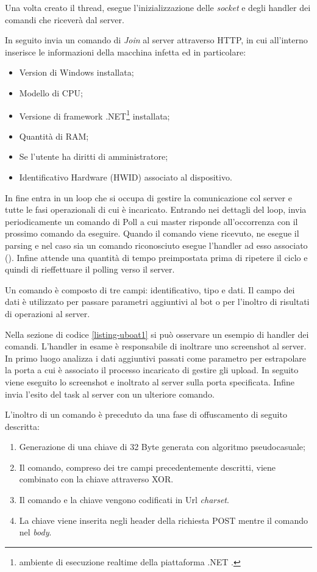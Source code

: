 Una  volta creato il thread, esegue l'inizializzazione delle \textit{socket} e degli handler dei comandi che riceverà dal server.

In seguito invia un comando di \textit{Join} al server attraverso HTTP, in cui all'interno inserisce le informazioni della macchina infetta ed in particolare:
\begin{itemize}
    \item Version di Windows installata;
    \item Modello di CPU;
    \item Versione di framework .NET\footnote{ambiente di esecuzione realtime della piattaforma .NET \cite{netframework}.} installata;
    \item Quantità di RAM;
    \item Se l'utente ha diritti di amministratore;
    \item Identificativo Hardware (HWID) associato al dispositivo.
\end{itemize}
In fine entra in un loop che si occupa di gestire la comunicazione col server e tutte le fasi operazionali di cui è incaricato.
Entrando nei dettagli del loop, invia periodicamente un comando di Poll  a cui master risponde all'occorrenza con il prossimo comando da eseguire. Quando il comando viene ricevuto, ne esegue il parsing e nel caso sia un comando riconosciuto esegue l'handler ad esso associato (). Infine attende una quantità di tempo preimpostata prima di ripetere il ciclo e quindi di rieffettuare il polling verso il server.

\medskip
Un comando è composto di tre campi: identificativo, tipo e dati.
Il campo dei dati è utilizzato per passare parametri aggiuntivi al bot o per l'inoltro di risultati di operazioni al server.

Nella sezione di codice \ref{listing-uboat1} si può osservare un esempio di handler dei comandi. L'handler in esame è  responsabile di inoltrare uno screenshot al server.  In primo luogo analizza i dati aggiuntivi passati come parametro per estrapolare la porta a cui è associato il processo incaricato di gestire gli upload. In seguito viene eseguito lo screenshot e inoltrato al server sulla porta specificata. Infine invia l'esito del task al server con un ulteriore comando.





\medskip

L'inoltro di un comando è preceduto da una fase di offuscamento di seguito descritta: 
\begin{enumerate}
    \item Generazione di una chiave di 32 Byte generata con algoritmo pseudocasuale;
    \item Il comando, compreso dei tre campi precedentemente descritti, viene combinato con la chiave attraverso XOR.
    \item Il comando e la chiave vengono codificati in Url \textit{charset}.
    \item La chiave viene inserita negli header della richiesta POST mentre il comando nel \textit{body}.
\end{enumerate}

